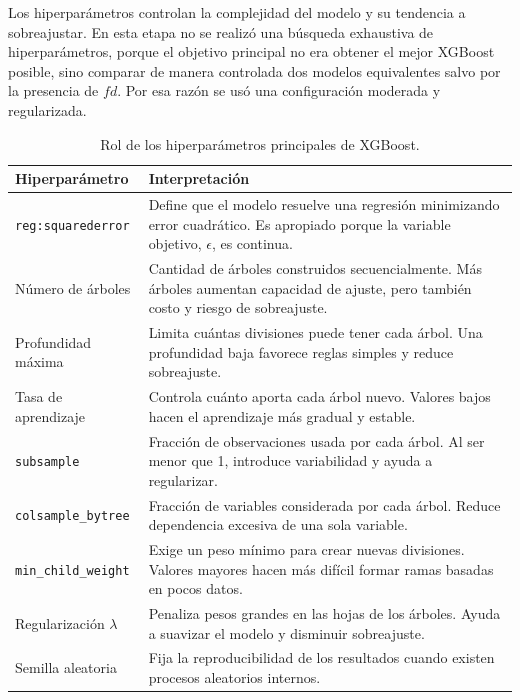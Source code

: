 \documentclass[12pt, letterpaper]{article}
\begin{document}
Los hiperpar\'ametros controlan la complejidad del modelo y su tendencia a sobreajustar. En esta etapa no se realiz\'o una b\'usqueda exhaustiva de hiperpar\'ametros, porque el objetivo principal no era obtener el mejor XGBoost posible, sino comparar de manera controlada dos modelos equivalentes salvo por la presencia de \(fd\). Por esa raz\'on se us\'o una configuraci\'on moderada y regularizada.

\begin{table}[H]
\centering
\caption{Rol de los hiperpar\'ametros principales de XGBoost.}
\label{tab:interpretacion_hiperparametros}
\small
\begin{tabularx}{\textwidth}{lX}
\toprule
\textbf{Hiperpar\'ametro} & \textbf{Interpretaci\'on} \\
\midrule
\texttt{reg:squarederror} & Define que el modelo resuelve una regresi\'on minimizando error cuadr\'atico. Es apropiado porque la variable objetivo, \(\epsilon\), es continua. \\
N\'umero de \'arboles & Cantidad de \'arboles construidos secuencialmente. M\'as \'arboles aumentan capacidad de ajuste, pero tambi\'en costo y riesgo de sobreajuste. \\
Profundidad m\'axima & Limita cu\'antas divisiones puede tener cada \'arbol. Una profundidad baja favorece reglas simples y reduce sobreajuste. \\
Tasa de aprendizaje & Controla cu\'anto aporta cada \'arbol nuevo. Valores bajos hacen el aprendizaje m\'as gradual y estable. \\
\texttt{subsample} & Fracci\'on de observaciones usada por cada \'arbol. Al ser menor que 1, introduce variabilidad y ayuda a regularizar. \\
\texttt{colsample\_bytree} & Fracci\'on de variables considerada por cada \'arbol. Reduce dependencia excesiva de una sola variable. \\
\texttt{min\_child\_weight} & Exige un peso m\'inimo para crear nuevas divisiones. Valores mayores hacen m\'as dif\'icil formar ramas basadas en pocos datos. \\
Regularizaci\'on \(\lambda\) & Penaliza pesos grandes en las hojas de los \'arboles. Ayuda a suavizar el modelo y disminuir sobreajuste. \\
Semilla aleatoria & Fija la reproducibilidad de los resultados cuando existen procesos aleatorios internos. \\
\bottomrule
\end{tabularx}
\end{table}
\end{document}
